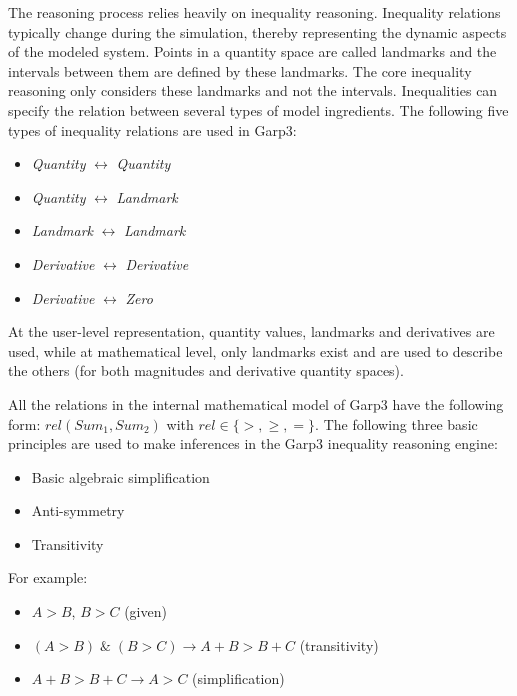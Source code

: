\documentclass{article} %
\begin{document}
The reasoning process relies heavily on inequality reasoning.
Inequality relations typically change during the 
simulation, thereby representing the dynamic aspects of the modeled system. 
Points in a quantity space are called landmarks and the intervals between them
are defined by these landmarks. The core inequality reasoning only considers
these landmarks and not the intervals. Inequalities can specify the relation
between several types of model ingredients. The following five types of
inequality relations are used in Garp3:

\begin{itemize}

\item \emph{Quantity} $\leftrightarrow$ \emph{Quantity}

\item \emph{Quantity} $\leftrightarrow$ \emph{Landmark}

\item \emph{Landmark} $\leftrightarrow$ \emph{Landmark}

\item \emph{Derivative} $\leftrightarrow$ \emph{Derivative}

\item \emph{Derivative} $\leftrightarrow$ \emph{Zero}

\end{itemize}

At the user-level representation, quantity values, landmarks and derivatives are
used, while at mathematical level, only landmarks exist and are used to
describe the others (for both magnitudes and derivative quantity spaces).

All the relations in the internal mathematical model of Garp3 have the
following form: $rel(Sum_1, Sum_2)$ with $rel \in \{>,\ge,=\}$. The following
three basic principles are used to make inferences in the Garp3 inequality
reasoning engine:

\begin{itemize}
\item Basic algebraic simplification
\item Anti-symmetry
\item Transitivity
\end{itemize}

For example:

\begin{itemize}
\item $A>B$, $B>C$ (given)
\item $(A>B) \; \& \; (B>C) \rightarrow A+B>B+C$ (transitivity)
\item $A+B>B+C \rightarrow A>C$ (simplification)
\end{itemize}
\end{document}
